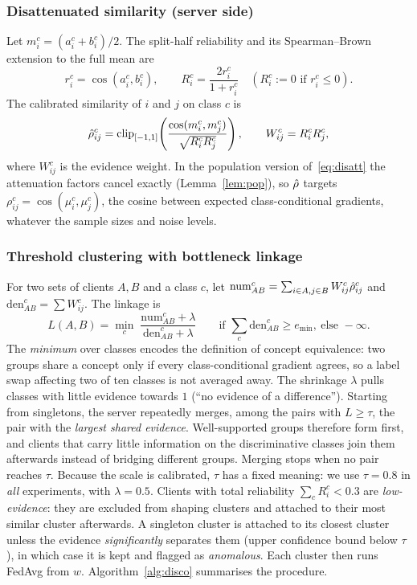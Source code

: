 \subsubsection{Disattenuated similarity (server side)}
Let $m_i^c=(a_i^c+b_i^c)/2$. The split-half reliability and its Spearman--Brown extension to the full mean are
\begin{equation}\label{eq:rel}
r_i^c=\cos(a_i^c,b_i^c),\qquad R_i^c=\frac{2r_i^c}{1+r_i^c}\quad(R_i^c:=0 \text{ if } r_i^c\le 0).
\end{equation}
The calibrated similarity of $i$ and $j$ on class $c$ is
\begin{equation}\label{eq:disatt}
\hat\rho_{ij}^c=\operatorname{clip}_{[-1,1]}\!\left(\frac{\cos(m_i^c,m_j^c)}{\sqrt{R_i^cR_j^c}}\right),\qquad W_{ij}^c=R_i^cR_j^c,
\end{equation}
where $W_{ij}^c$ is the evidence weight. In the population version of~\eqref{eq:disatt} the attenuation factors cancel exactly (Lemma~\ref{lem:pop}), so $\hat\rho$ targets $\rho_{ij}^c=\cos(\mu_i^c,\mu_j^c)$, the cosine between expected class-conditional gradients, whatever the sample sizes and noise levels.

\subsubsection{Threshold clustering with bottleneck linkage}
For two sets of clients $A,B$ and a class $c$, let $\mathrm{num}^c_{AB}=\sum_{i\in A,j\in B}W_{ij}^c\hat\rho_{ij}^c$ and $\mathrm{den}^c_{AB}=\sum W_{ij}^c$. The linkage is
\begin{equation}\label{eq:link}
L(A,B)=\min_{c}\;\frac{\mathrm{num}^c_{AB}+\lambda}{\mathrm{den}^c_{AB}+\lambda}\qquad\text{if }\textstyle\sum_c\mathrm{den}^c_{AB}\ge e_{\min},\ \text{else }-\infty.
\end{equation}
The \emph{minimum} over classes encodes the definition of concept equivalence: two groups share a concept only if every class-conditional gradient agrees, so a label swap affecting two of ten classes is not averaged away. The shrinkage $\lambda$ pulls classes with little evidence towards $1$ (``no evidence of a difference''). Starting from singletons, the server repeatedly merges, among the pairs with $L\ge\tau$, the pair with the \emph{largest shared evidence}. Well-supported groups therefore form first, and clients that carry little information on the discriminative classes join them afterwards instead of bridging different groups. Merging stops when no pair reaches $\tau$. Because the scale is calibrated, $\tau$ has a fixed meaning: we use $\tau=0.8$ in \emph{all} experiments, with $\lambda=0.5$. Clients with total reliability $\sum_c R_i^c<0.3$ are \emph{low-evidence}: they are excluded from shaping clusters and attached to their most similar cluster afterwards. A singleton cluster is attached to its closest cluster unless the evidence \emph{significantly} separates them (upper confidence bound below $\tau$), in which case it is kept and flagged as \emph{anomalous}. Each cluster then runs FedAvg from $w$. Algorithm~\ref{alg:disco} summarises the procedure.

